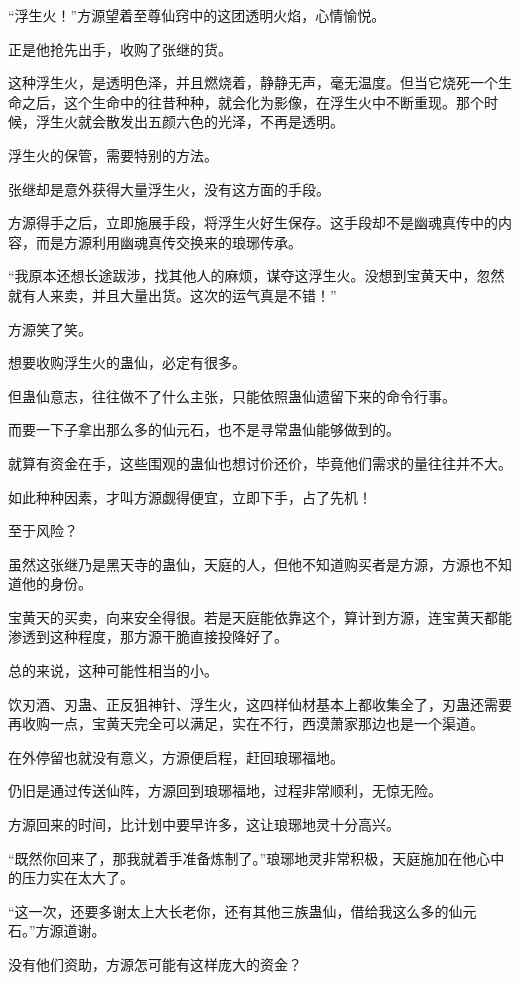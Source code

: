 \begin{this_body}
“浮生火！”方源望着至尊仙窍中的这团透明火焰，心情愉悦。

正是他抢先出手，收购了张继的货。

这种浮生火，是透明色泽，并且燃烧着，静静无声，毫无温度。但当它烧死一个生命之后，这个生命中的往昔种种，就会化为影像，在浮生火中不断重现。那个时候，浮生火就会散发出五颜六色的光泽，不再是透明。

浮生火的保管，需要特别的方法。

张继却是意外获得大量浮生火，没有这方面的手段。

方源得手之后，立即施展手段，将浮生火好生保存。这手段却不是幽魂真传中的内容，而是方源利用幽魂真传交换来的琅琊传承。

“我原本还想长途跋涉，找其他人的麻烦，谋夺这浮生火。没想到宝黄天中，忽然就有人来卖，并且大量出货。这次的运气真是不错！”

方源笑了笑。

想要收购浮生火的蛊仙，必定有很多。

但蛊仙意志，往往做不了什么主张，只能依照蛊仙遗留下来的命令行事。

而要一下子拿出那么多的仙元石，也不是寻常蛊仙能够做到的。

就算有资金在手，这些围观的蛊仙也想讨价还价，毕竟他们需求的量往往并不大。

如此种种因素，才叫方源觑得便宜，立即下手，占了先机！

至于风险？

虽然这张继乃是黑天寺的蛊仙，天庭的人，但他不知道购买者是方源，方源也不知道他的身份。

宝黄天的买卖，向来安全得很。若是天庭能依靠这个，算计到方源，连宝黄天都能渗透到这种程度，那方源干脆直接投降好了。

总的来说，这种可能性相当的小。

饮刃酒、刃蛊、正反狙神针、浮生火，这四样仙材基本上都收集全了，刃蛊还需要再收购一点，宝黄天完全可以满足，实在不行，西漠萧家那边也是一个渠道。

在外停留也就没有意义，方源便启程，赶回琅琊福地。

仍旧是通过传送仙阵，方源回到琅琊福地，过程非常顺利，无惊无险。

方源回来的时间，比计划中要早许多，这让琅琊地灵十分高兴。

“既然你回来了，那我就着手准备炼制了。”琅琊地灵非常积极，天庭施加在他心中的压力实在太大了。

“这一次，还要多谢太上大长老你，还有其他三族蛊仙，借给我这么多的仙元石。”方源道谢。

没有他们资助，方源怎可能有这样庞大的资金？


\end{this_body}
